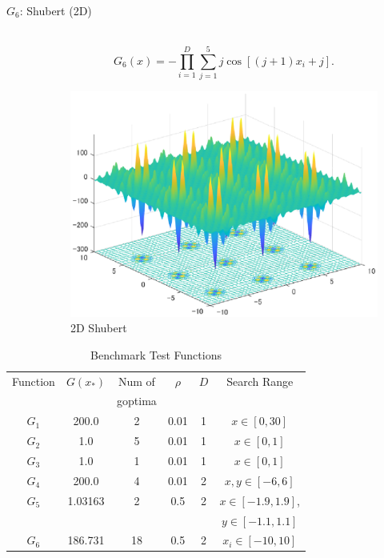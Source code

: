 \documentclass[a4j,11pt]{jarticle}
\begin{document}
\begin{description}
\item[$G_6$: Shubert (2D)]\mbox{}\\
\begin{equation}
\label{eq:maxF6}
G_6(x)=-\prod_{i=1}^D \sum_{j=1}^5 j\cos[(j+1)x_i+j].
\end{equation}
\begin{figure}[h]
\centering
\includegraphics[width=0.8\linewidth]{eps/F6.eps}
\caption{2D Shubert}
\label{fig:maxF6}
\end{figure}

\end{description}

\begin{table}[h]
\caption{Benchmark Test Functions}
\begin{center}
\begin{tabular}{c|c|c|c|c|c}
\hline

Function & $G(x_*)$ & Num of & $\rho$ & $D$ & Search Range \\
& & goptima & & & \\
\hline
$G_1$ & 200.0 & 2 & 0.01 & 1 & $x \in [0,30]$  \\
\hline
$G_2$ & 1.0 & 5 & 0.01 & 1 & $x \in [0,1]$  \\
\hline
$G_3$ & 1.0 & 1 & 0.01 & 1 & $x \in [0,1]$  \\
\hline
$G_4$ & 200.0 & 4 & 0.01 & 2 & $x,y \in [-6,6]$  \\
\hline
$G_5$ & 1.03163 & 2 & 0.5 & 2 & $x \in [-1.9,1.9]$, \\
& & & & & $y \in [-1.1,1.1]$ \\
\hline
$G_6$ & 186.731 & 18 & 0.5 & 2 & $x_i \in [-10,10]$  \\
\hline
\end{tabular}
\label{tab:maxMOP}
\end{center}
\end{table}
\end{document}
